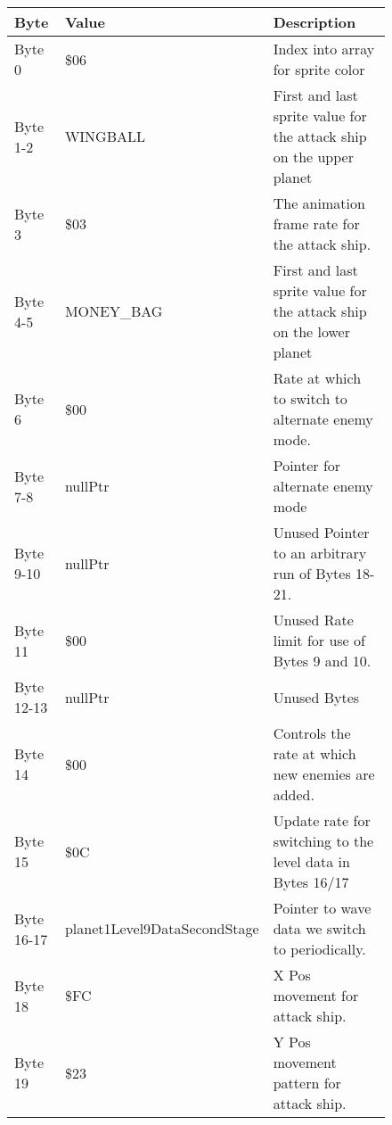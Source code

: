\begin{figure}[H]
  {
  \setlength{\tabcolsep}{3.0pt}
  \setlength\cmidrulewidth{\heavyrulewidth} %
  \begin{adjustbox}{width=12cm}

\begin{tabular}{lll}
\toprule
 Byte       & Value                        & Description                                                         \\
\midrule
 Byte 0     & \$06                          & Index into array for sprite color                                   \\
 Byte 1-2   & WINGBALL                     & First and last sprite value for the attack ship on the upper planet \\
 Byte 3     & \$03                          & The animation frame rate for the attack ship.                       \\
 Byte 4-5   & MONEY\_BAG                    & First and last sprite value for the attack ship on the lower planet \\
 Byte 6     & \$00                          & Rate at which to switch to alternate enemy mode.                    \\
 Byte 7-8   & nullPtr                      & Pointer for alternate enemy mode                                    \\
 Byte 9-10  & nullPtr                      & Unused Pointer to an arbitrary run of Bytes 18-21.                  \\
 Byte 11    & \$00                          & Unused Rate limit for use of Bytes 9 and 10.                        \\
 Byte 12-13 & nullPtr                      & Unused Bytes                                                        \\
 Byte 14    & \$00                          & Controls the rate at which new enemies are added.                   \\
 Byte 15    & \$0C                          & Update rate for switching to the level data in Bytes 16/17          \\
 Byte 16-17 & planet1Level9DataSecondStage & Pointer to wave data we switch to periodically.                     \\
 Byte 18    & \$FC                          & X Pos movement for attack ship.                                     \\
 Byte 19    & \$23                          & Y Pos movement pattern for attack ship.                             \\

\end{tabular}
\end{adjustbox}}
\end{figure}
